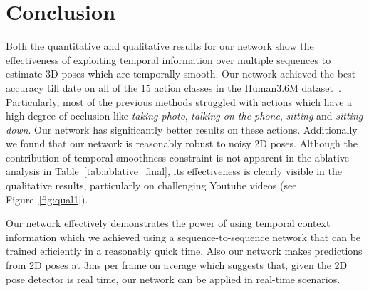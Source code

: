 \documentclass[runningheads]{llncs}
\begin{document}
\section{Conclusion}
Both the quantitative and qualitative results for our network show the effectiveness of exploiting temporal information over multiple sequences to estimate 3D poses which are temporally smooth. Our network achieved the best accuracy till date on all of the 15 action classes in the Human3.6M dataset~\cite{h36m_pami}. Particularly, most of the previous methods struggled with actions which have a high degree of occlusion like  \emph{taking photo}, \emph{talking on the phone}, \emph{sitting} and \emph{sitting down}. Our network has significantly better results on these actions. Additionally we found that our network is reasonably robust to noisy 2D poses. Although the contribution of temporal smoothness constraint is not apparent in the ablative analysis in Table~\ref{tab:ablative_final}, its effectiveness is clearly visible in the qualitative results, particularly on challenging Youtube videos (see Figure~\ref{fig:qual1}). 

Our network effectively demonstrates the power of using temporal context information which we achieved using a sequence-to-sequence network that can be trained efficiently in a reasonably quick time. Also our network makes predictions from 2D poses at 3ms per frame on average which suggests that, given the 2D pose detector is real time, our network can be applied in real-time scenarios. 




\clearpage



\end{document}
